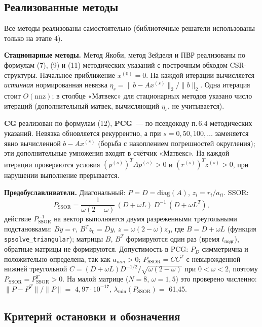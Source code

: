 \documentclass[12pt]{article}
\begin{document}
\subsection{Реализованные методы}

Все методы реализованы самостоятельно (библиотечные решатели использованы только на этапе 4).\par

\textbf{Стационарные методы.} Метод Якоби, метод Зейделя и ПВР реализованы по формулам (7), (9) и (11) методических указаний с построчным обходом CSR-структуры. Начальное приближение $x^{(0)}=0$. На каждой итерации вычисляется \emph{истинная} нормированная невязка $\eta_s=\|b-Ax^{(s)}\|_2/\|b\|_2$. Одна итерация стоит $O(\mathrm{nnz})$; в столбце «Матвекс» для стационарных методов указано число итераций (дополнительный матвек, вычисляющий $\eta_s$, не учитывается).\par

\textbf{CG} реализован по формулам (12), \textbf{PCG}~--- по псевдокоду п.\,6.4 методических указаний. Невязка обновляется рекуррентно, а при $s=0,50,100,\dots$ заменяется явно вычисленной $b-Ax^{(s)}$ (борьба с накоплением погрешностей округления); эти дополнительные умножения входят в счётчик «Матвекс». На каждой итерации проверяются условия $(p^{(s)})^TAp^{(s)}>0$ и $(r^{(s)})^Tz^{(s)}>0$, при нарушении выполнение прерывается.\par

\textbf{Предобуславливатели.} Диагональный: $P=D=\mathrm{diag}(A)$, $z_i=r_i/a_{ii}$. SSOR:
\[
P_\text{SSOR}=\frac{1}{\omega(2-\omega)}\,(D+\omega L)\,D^{-1}\,(D+\omega L^T),
\]
действие $P_\text{SSOR}^{-1}$ на вектор выполняется двумя разреженными треугольными подстановками: $By=r$, $B^Tz_0=Dy$, $z=\omega(2-\omega)z_0$, где $B=D+\omega L$ (функция \texttt{spsolve\_triangular}); матрицы $B$, $B^T$ формируются один раз (время $t_\text{подг}$), обратные матрицы не формируются. Допустимость в PCG: $P_D$ симметрична и положительно определена, так как $a_{mm}>0$; $P_\text{SSOR}=CC^T$ с невырожденной нижней треугольной $C=(D+\omega L)D^{-1/2}/\sqrt{\omega(2-\omega)}$ при $0<\omega<2$, поэтому $P_\text{SSOR}=P_\text{SSOR}^T>0$. На малой матрице ($N=8$, $\omega=1{,}5$) это проверено численно: $\|P-P^T\|/\|P\|=$ $4{,}97\cdot10^{-17}$, $\lambda_{\min}(P_\text{SSOR})=$ 61{,}45.\par

\subsection{Критерий остановки и обозначения}
\end{document}
